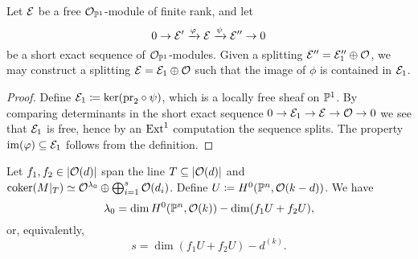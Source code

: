 \begin{lemma} \label{mini-splitting-lemma}
	Let $\mathcal{E}$ be a free $\mathcal{O}_{\mathbb{P}^1}$-module of finite rank, and let 
	\[
		0 \to \mathcal{E}' \xrightarrow{\varphi} \mathcal{E} \xrightarrow{\psi} \mathcal{E}'' \to 0
 	\]
 	be a short exact sequence of $\mathcal{O}_{\mathbb{P}^1}$-modules. Given a splitting $\mathcal{E}'' = \mathcal{E}''_1 \oplus \mathcal{O}$, we may construct a splitting $\mathcal{E} = \mathcal{E}_1 \oplus \mathcal{O}$ such that the image of $\phi$ is contained in $\mathcal{E}_1$.
\end{lemma}

\begin{proof}
	Define $\mathcal{E}_1 \coloneqq \ker(\mathrm{pr}_2\circ\psi)$, which is a locally free sheaf on $\mathbb{P}^1$. By comparing determinants in the short exact sequence $0 \to \mathcal{E}_1 \to \mathcal{E} \to \mathcal{O} \to 0$ we see that $\mathcal{E}_1$ is free, hence by an $\operatorname{Ext}^1$ computation the sequence splits. The property $\operatorname{im}(\varphi) \subseteq \mathcal{E}_1$ follows from the definition.
\end{proof}

\begin{proposition} \label{number-zeroes}
	Let $f_1, f_2 \in \lvert\mathcal{O}(d)\rvert$ span the line
	$T \subseteq \lvert\mathcal{O}(d)\rvert$ and $\operatorname{coker}(M|_{T}) \simeq \mathcal{O}^{\lambda_0}
	\oplus \bigoplus_{i=1}^s \mathcal{O}(d_i)$. Define $U\coloneqq H^0(\mathbb{P}^n,\mathcal{O}(k-d))$. We have
	\[
	\lambda_0 = \dim H^0(\mathbb{P}^n,\mathcal{O}(k)) - \dim ({f_1 U + f_2 U}),
	\]
	or, equivalently,
	\[
		s = \dim({f_1 U + f_2 U}) - d^{(k)}.
	\]
\end{proposition}


